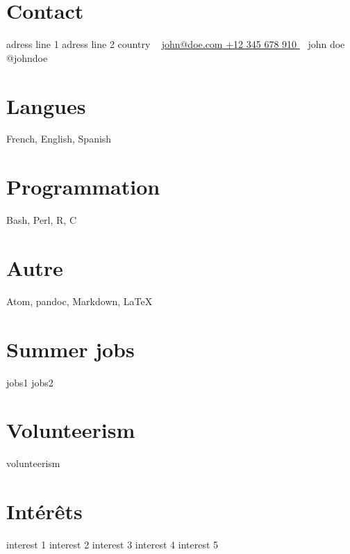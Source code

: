 \documentclass[]{friggeri-cv}
\begin{document}
	\setlength{\textheight}{700pt}



	\begin{aside}
		\setlength{\fboxsep}{0pt}  %
		\setlength{\fboxrule}{2pt} %
		\section{Contact \faHome}
			adress line 1
			adress line 2
			country
			~
			\href{mailto:john@doe.com}{john@doe.com \faInbox}
			\href{tel:+12345678910}{+12 345 678 910 \faPhone}
			~
			john doe \faLinkedin
			@johndoe \faTwitter
		\section{Langues \faGlobe}
			French, English, Spanish
		\section{Programmation \faLaptop}
			Bash, Perl, R, C
		\section{Autre \faTerminal}
			Atom, pandoc, Markdown, \LaTeX
		\section{Summer jobs \faIndustry}
			jobs1
			jobs2
		\section{Volunteerism \faUsers}
			volunteerism
		\section{Intérêts \faHeart}
			interest 1
			interest 2
			interest 3
			interest 4
			interest 5
	\end{aside}
\end{document}
